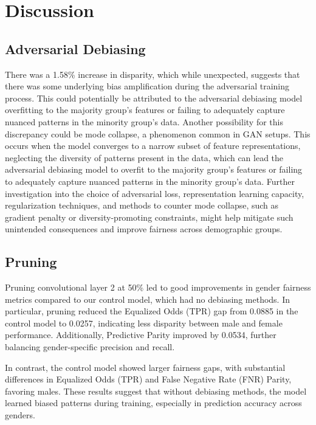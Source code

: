 \documentclass[11pt]{article}
\begin{document}
\section{Discussion}

\subsection{Adversarial Debiasing}

There was a 1.58\% increase in disparity, which while unexpected, suggests that there was some underlying bias amplification during the adversarial training process. This could potentially be attributed to the adversarial debiasing model overfitting to the majority group's features or failing to adequately capture nuanced patterns in the minority group's data. Another possibility for this discrepancy could be mode collapse, a phenomenon common in GAN setups. This occurs when the model converges to a narrow subset of feature representations, neglecting the diversity of patterns present in the data, which can lead the adversarial debiasing model to overfit to the majority group's features or failing to adequately capture nuanced patterns in the minority group's data. Further investigation into the choice of adversarial loss, representation learning capacity, regularization techniques, and methods to counter mode collapse, such as gradient penalty or diversity-promoting constraints, might help mitigate such unintended consequences and improve fairness across demographic groups.

\subsection{Pruning}

Pruning convolutional layer 2 at 50\% led to good improvements in gender fairness metrics compared to our control model, which had no debiasing methods. In particular, pruning reduced the Equalized Odds (TPR) gap from 0.0885 in the control model to 0.0257, indicating less disparity between male and female performance. Additionally, Predictive Parity improved by 0.0534, further balancing gender-specific precision and recall.

In contrast, the control model showed larger fairness gaps, with substantial differences in Equalized Odds (TPR) and False Negative Rate (FNR) Parity, favoring males. These results suggest that without debiasing methods, the model learned biased patterns during training, especially in prediction accuracy across genders.
\end{document}
